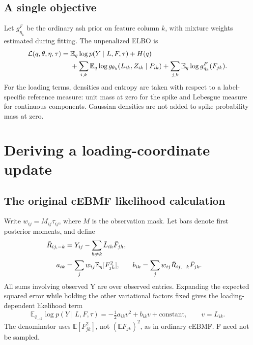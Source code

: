 \documentclass[11pt,a4paper]{article}
\newcommand{\E}{\mathbb E}
\newcommand{\LL}{\mathcal L}
\begin{document}
\subsection{A single objective}
Let \(g^F_{\eta_k}\) be the ordinary ash prior on feature column \(k\), with
mixture weights estimated during fitting. The unpenalized ELBO is
\begin{align}
\LL(q,\theta,\eta,\tau)
={}&\E_q\log p(Y\mid L,F,\tau)+H(q)\notag\\
 &+\sum_{i,k}\E_q\log g_{\theta_k}(L_{ik},Z_{ik}\mid P_{ik})
 +\sum_{j,k}\E_q\log g^F_{\eta_k}(F_{jk}).
\label{eq:elbo}
\end{align}
For the loading terms, densities and entropy are taken with respect to a
label-specific reference measure: unit mass at zero for the spike and
Lebesgue measure for continuous components. Gaussian densities are not
added to spike probability mass at zero.

\clearpage
\section{Deriving a loading-coordinate update}
\subsection{The original cEBMF likelihood calculation}
Write \(w_{ij}=M_{ij}\tau_{ij}\), where \(M\) is the observation mask. Let bars
denote first posterior moments, and define
\begin{align}
\bar R_{ij,-k}&=Y_{ij}-\sum_{h\ne k}\bar L_{ih}\bar F_{jh},\notag\\
a_{ik}&=\sum_jw_{ij}\E_q[F_{jk}^2],&
b_{ik}&=\sum_jw_{ij}\bar R_{ij,-k}\bar F_{jk}.
\label{eq:stats}
\end{align}
All sums involving observed Y are over observed entries. Expanding the
expected squared error while holding the other variational factors fixed
gives the loading-dependent likelihood term
\begin{equation}
\E_{q_{-ik}}\log p(Y\mid L,F,\tau)
=-\tfrac12a_{ik}v^2+b_{ik}v+\text{constant},\qquad v=L_{ik}.
\label{eq:quadratic}
\end{equation}
The denominator uses \(\E[F_{jk}^2]\), not \((\E F_{jk})^2\), as in
ordinary cEBMF. F need not be sampled.
\end{document}
